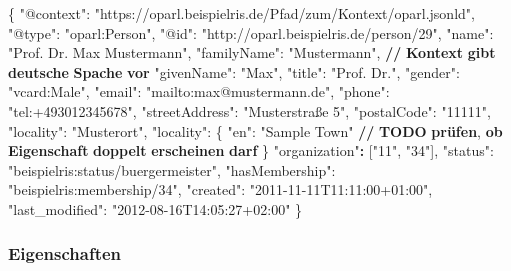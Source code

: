 \documentclass[,a4paper]{article}
\newenvironment{Shaded}{}{}
\newcommand{\DataTypeTok}[1]{\textcolor[rgb]{0.56,0.13,0.00}{{#1}}}
\newcommand{\StringTok}[1]{\textcolor[rgb]{0.25,0.44,0.63}{{#1}}}
\newcommand{\ErrorTok}[1]{\textcolor[rgb]{1.00,0.00,0.00}{\textbf{{#1}}}}
\newcommand{\NormalTok}[1]{{#1}}
\begin{document}
\begin{Shaded}
\begin{Highlighting}[]
\NormalTok{\{}
    \DataTypeTok{"@context"}\NormalTok{: }\StringTok{"https://oparl.beispielris.de/Pfad/zum/Kontext/oparl.jsonld"}\NormalTok{,}
    \DataTypeTok{"@type"}\NormalTok{: }\StringTok{"oparl:Person"}\NormalTok{,}
    \DataTypeTok{"@id"}\NormalTok{: }\StringTok{"http://oparl.beispielris.de/person/29"}\NormalTok{,}
    \DataTypeTok{"name"}\NormalTok{: }\StringTok{"Prof. Dr. Max Mustermann"}\NormalTok{,}
    \DataTypeTok{"familyName"}\NormalTok{: }\StringTok{"Mustermann"}\NormalTok{, }\ErrorTok{//} \ErrorTok{Kontext} \ErrorTok{gibt} \ErrorTok{deutsche} \ErrorTok{Spache} \ErrorTok{vor}
    \DataTypeTok{"givenName"}\NormalTok{: }\StringTok{"Max"}\NormalTok{,}
    \DataTypeTok{"title"}\NormalTok{: }\StringTok{"Prof. Dr."}\NormalTok{,}
    \DataTypeTok{"gender"}\NormalTok{: }\StringTok{"vcard:Male"}\NormalTok{,}
    \DataTypeTok{"email"}\NormalTok{: }\StringTok{"mailto:max@mustermann.de"}\NormalTok{,}
    \DataTypeTok{"phone"}\NormalTok{: }\StringTok{"tel:+493012345678"}\NormalTok{,}
    \DataTypeTok{"streetAddress"}\NormalTok{: }\StringTok{"Musterstraße 5"}\NormalTok{,}
    \DataTypeTok{"postalCode"}\NormalTok{: }\StringTok{"11111"}\NormalTok{,}
    \DataTypeTok{"locality"}\NormalTok{: }\StringTok{"Musterort"}\NormalTok{,}
    \DataTypeTok{"locality"}\NormalTok{: \{}
        \DataTypeTok{"en"}\NormalTok{: }\StringTok{"Sample Town"} \ErrorTok{//} \ErrorTok{TODO} \ErrorTok{prüfen}\NormalTok{, }\ErrorTok{ob} \ErrorTok{Eigenschaft} \ErrorTok{doppelt} \ErrorTok{erscheinen} \ErrorTok{darf}
    \NormalTok{\}}
    \StringTok{"organization"}\ErrorTok{:} \NormalTok{[}\StringTok{"11"}\NormalTok{, }\StringTok{"34"}\NormalTok{],}
    \DataTypeTok{"status"}\NormalTok{: }\StringTok{"beispielris:status/buergermeister"}\NormalTok{,}
    \DataTypeTok{"hasMembership"}\NormalTok{: }\StringTok{"beispielris:membership/34"}\NormalTok{,}
    \DataTypeTok{"created"}\NormalTok{: }\StringTok{"2011-11-11T11:11:00+01:00"}\NormalTok{,}
    \DataTypeTok{"last_modified"}\NormalTok{: }\StringTok{"2012-08-16T14:05:27+02:00"}
\NormalTok{\}}
\end{Highlighting}
\end{Shaded}

\subsubsection{Eigenschaften}\label{eigenschaften-3}
\end{document}
